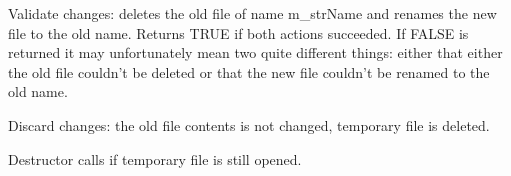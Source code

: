 Validate changes: deletes the old file of name m\_strName and renames the new
file to the old name. Returns TRUE if both actions succeeded. If FALSE is
returned it may unfortunately mean two quite different things: either that
either the old file couldn't be deleted or that the new file couldn't be renamed
to the old name.

\label{wxtempfilediscard}


Discard changes: the old file contents is not changed, temporary file is
deleted.

\label{wxtempfiledtor}


Destructor calls  if temporary file
is still opened.

